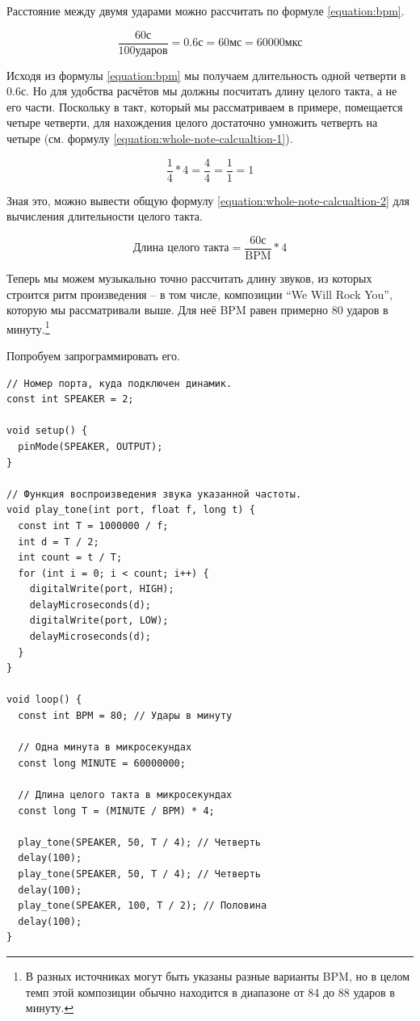 \documentclass[../sparc.tex]{subfiles}
\begin{document}
Расстояние между двумя ударами можно рассчитать по формуле \ref{equation:bpm}.

\begin{equation}
  \frac{60 \mbox{с}}{100 \mbox{ударов}} = 0.6 \mbox{с} = 60 \mbox{мс} = 60000 \mbox{мкс}
  \label{equation:bpm}
\end{equation}

Исходя из формулы \ref{equation:bpm} мы получаем длительность одной четверти в
0.6с. Но для удобства расчётов мы должны посчитать длину целого такта, а не его
части. Поскольку в такт, который мы рассматриваем в примере, помещается четыре
четверти, для нахождения целого достаточно умножить четверть на четыре (см.
формулу \ref{equation:whole-note-calcualtion-1}).

\begin{equation}
  \frac{1}{4} * 4 = \frac{4}{4} = \frac{1}{1} = 1
  \label{equation:whole-note-calcualtion-1}
\end{equation}

Зная это, можно вывести общую формулу \ref{equation:whole-note-calcualtion-2}
для вычисления длительности целого такта.

\begin{equation}
  \mbox{Длина целого такта} = \frac{\mbox{60} с}{\mbox{BPM}} * 4
  \label{equation:whole-note-calcualtion-2}
\end{equation}

Теперь мы можем музыкально точно рассчитать длину звуков, из которых строится
ритм произведения -- в том числе, композиции ``We Will Rock You'', которую мы
рассматривали выше. Для неё BPM равен примерно 80 ударов в минуту.\footnote{В
разных источниках могут быть указаны разные варианты BPM, но в целом темп этой
композиции обычно находится в диапазоне от 84 до 88 ударов в минуту.}

Попробуем запрограммировать его.

\begin{verbatim}
// Номер порта, куда подключен динамик.
const int SPEAKER = 2;

void setup() {
  pinMode(SPEAKER, OUTPUT);
}

// Функция воспроизведения звука указанной частоты.
void play_tone(int port, float f, long t) {
  const int T = 1000000 / f;
  int d = T / 2;
  int count = t / T;
  for (int i = 0; i < count; i++) {
    digitalWrite(port, HIGH);
    delayMicroseconds(d);
    digitalWrite(port, LOW);
    delayMicroseconds(d);
  }
}

void loop() {
  const int BPM = 80; // Удары в минуту

  // Одна минута в микросекундах
  const long MINUTE = 60000000;

  // Длина целого такта в микросекундах
  const long T = (MINUTE / BPM) * 4;

  play_tone(SPEAKER, 50, T / 4); // Четверть
  delay(100);
  play_tone(SPEAKER, 50, T / 4); // Четверть
  delay(100);
  play_tone(SPEAKER, 100, T / 2); // Половина
  delay(100);
}
\end{verbatim}
\end{document}
